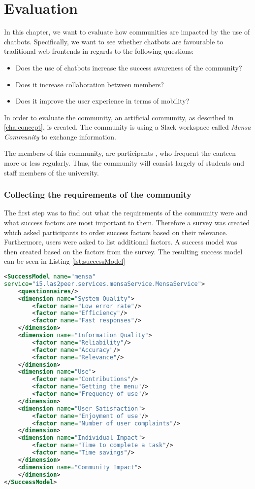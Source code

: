 \chapter{Evaluation}\label{cha:eval}
In this chapter, we want to evaluate how communities are impacted by the use of chatbots.
Specifically, we want to see whether chatbots are favourable to traditional web frontends in regards to the following questions:
\begin{itemize}
    \item Does the use of chatbots increase the success awareness of the community?
    \item Does it increase collaboration between members?
    \item Does it improve the user experience in terms of mobility?
\end{itemize}

In order to evaluate the community, an artificial community, as described in \ref{cha:concept}, is created.  The community is using a Slack workspace called \emph{Mensa Community} to exchange information.

The members of this community, are participants , who frequent the canteen more or less regularly.
Thus, the community will consist largely of students and staff members of the university.

\subsection{Collecting the requirements of the community}
The first step was to find out what the requirements of the community were and what success factors are most important to them. Therefore a survey was created which asked participants to order success factors based on their relevance. 
Furthermore, users were asked to list additional factors.
A success model was then created based on the factors from the survey. The resulting success model can be seen in Listing \ref{lst:successModel}

\begin{lstlisting}[language=XML,caption=Success Model based on requirements, label=lst:successModel]
<SuccessModel name="mensa" 
service="i5.las2peer.services.mensaService.MensaService">
    <questionnaires/>
    <dimension name="System Quality">
        <factor name="Low error rate"/>
        <factor name="Efficiency"/>
        <factor name="Fast responses"/>
    </dimension>
    <dimension name="Information Quality">
        <factor name="Reliability"/>
        <factor name="Accuracy"/>
        <factor name="Relevance"/>
    </dimension>
    <dimension name="Use">
        <factor name="Contributions"/>
        <factor name="Getting the menu"/>
        <factor name="Frequency of use"/>
    </dimension>
    <dimension name="User Satisfaction">
        <factor name="Enjoyment of use"/>
        <factor name="Number of user complaints"/>
    </dimension>
    <dimension name="Individual Impact">
        <factor name="Time to complete a task"/>
        <factor name="Time savings"/>
    </dimension>
    <dimension name="Community Impact">
    </dimension>
</SuccessModel>
\end{lstlisting}

